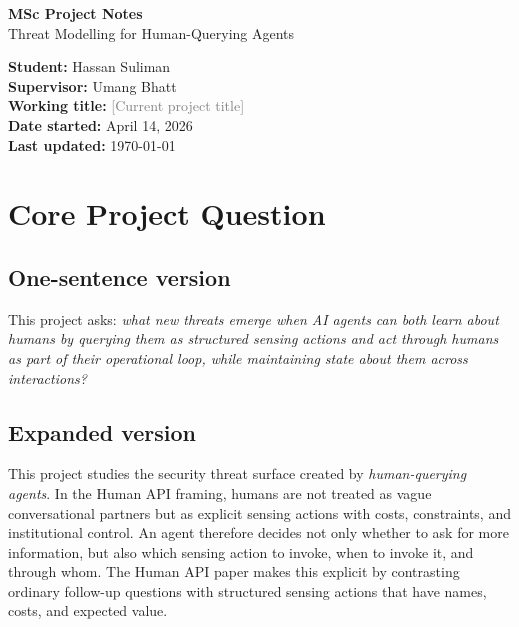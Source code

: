 \documentclass[11pt]{article}
\newcommand{\fillin}[1]{\textcolor{gray}{[#1]}}
\begin{document}
\begin{center}
    {\LARGE \textbf{MSc Project Notes}}\\[0.4em]
    {\large Threat Modelling for Human-Querying Agents}
\end{center}

\vspace{1em}

\noindent
\textbf{Student:} Hassan Suliman \\
\textbf{Supervisor:} Umang Bhatt \\
\textbf{Working title:} \fillin{Current project title} \\
\textbf{Date started:} April 14, 2026 \\
\textbf{Last updated:} \today

\vspace{1em}
\tableofcontents
\vspace{1em}

\section{Core Project Question}

\subsection{One-sentence version}

This project asks: \emph{what new threats emerge when AI agents can both \emph{learn about} humans by querying them as structured sensing actions and \emph{act through} humans as part of their operational loop, while maintaining state about them across interactions?}\citep{franklin2026agenttraps,schroeder2025multiagentsecurity,oliver2026humanapi}

\subsection{Expanded version}

This project studies the security threat surface created by \emph{human-querying agents}. In the Human API framing, humans are not treated as vague conversational partners but as explicit sensing actions with costs, constraints, and institutional control. An agent therefore decides not only whether to ask for more information, but also which sensing action to invoke, when to invoke it, and through whom. The Human API paper makes this explicit by contrasting ordinary follow-up questions with structured sensing actions that have names, costs, and expected value. \citep{oliver2026humanapi}
\end{document}
